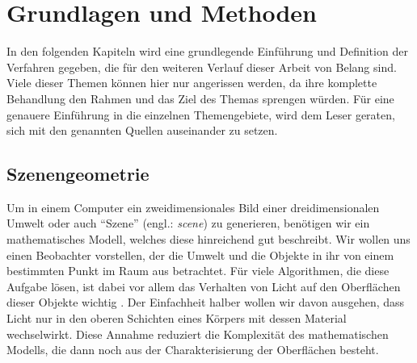 \section{Grundlagen und Methoden} %
\label{sec:grundlagen_und_methoden}

	In den folgenden Kapiteln wird eine grundlegende Einführung und Definition der Verfahren gegeben, die für den weiteren Verlauf dieser Arbeit von Belang sind.
	Viele dieser Themen können hier nur angerissen werden, da ihre komplette Behandlung den Rahmen und das Ziel des Themas sprengen würden.
	Für eine genauere Einführung in die einzelnen Themengebiete, wird dem Leser geraten, sich mit den genannten Quellen auseinander zu setzen.

	\subsection{Szenengeometrie} %
	\label{sub:szenengeometrie}

		Um in einem Computer ein zweidimensionales Bild einer dreidimensionalen Umwelt oder auch \enquote{Szene} (engl.: \textit{scene}) zu generieren, benötigen wir ein mathematisches Modell, welches diese hinreichend gut beschreibt.
		Wir wollen uns einen Beobachter vorstellen, der die Umwelt und die Objekte in ihr von einem bestimmten Punkt im Raum aus betrachtet.
		Für viele Algorithmen, die diese Aufgabe lösen, ist dabei vor allem das Verhalten von Licht auf den Oberflächen dieser Objekte wichtig \cite{pbrt3, kajiya-lte, veach-thesis}.
		Der Einfachheit halber wollen wir davon ausgehen, dass Licht nur in den oberen Schichten eines Körpers mit dessen Material wechselwirkt.
		Diese Annahme reduziert die Komplexität des mathematischen Modells, die dann noch aus der Charakterisierung der Oberflächen besteht.

